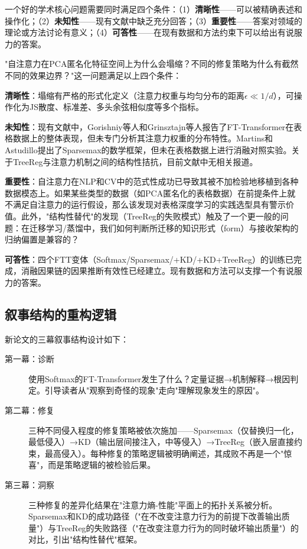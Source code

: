 \documentclass[UTF8,a4paper,12pt,fontset=fandol]{ctexart}
\begin{document}
一个好的学术核心问题需要同时满足四个条件：（1）\textbf{清晰性}——可以被精确表述和操作化；（2）\textbf{未知性}——现有文献中缺乏充分回答；（3）\textbf{重要性}——答案对领域的理论或方法讨论有意义；（4）\textbf{可答性}——在现有数据和方法约束下可以给出有说服力的答案。

"自注意力在PCA匿名化特征空间上为什么会塌缩？不同的修复策略为什么有截然不同的效果边界？"这一问题满足以上四个条件：

\textbf{清晰性}：塌缩有严格的形式化定义（注意力权重与均匀分布的距离$\epsilon \ll 1/d$），可操作化为JS散度、标准差、多头余弦相似度等多个指标。

\textbf{未知性}：现有文献中，Gorishniy等人\cite{gorishniy2021revisiting}和Grinsztajn等人\cite{grinsztajn2022tree}报告了FT-Transformer在表格数据上的整体表现，但未专门分析其注意力权重的分布特性。Martins和Astudillo\cite{martins2016sparsemax}提出了Sparsemax的数学框架，但未在表格数据上进行消融对照实验。关于TreeReg与注意力机制之间的结构性拮抗，目前文献中无相关报道。

\textbf{重要性}：自注意力在NLP和CV中的范式性成功已导致其被不加检验地移植到各种数据模态上。如果某些类型的数据（如PCA匿名化的表格数据）在前提条件上就不满足自注意力的运行假设，那么该发现对表格深度学习的实践选型具有警示价值。此外，"结构性替代"的发现（TreeReg的失败模式）触及了一个更一般的问题：在迁移学习/蒸馏中，我们如何判断所迁移的知识形式（form）与接收架构的归纳偏置是兼容的？

\textbf{可答性}：四个FTT变体（Softmax/Sparsemax/+KD/+KD+TreeReg）的训练已完成，消融因果链的因果推断有效性已经建立。现有数据和方法可以支撑一个有说服力的答案。

\subsection{叙事结构的重构逻辑}

新论文的三幕叙事结构设计如下：

\begin{description}
    \item[第一幕：诊断] 使用Softmax的FT-Transformer发生了什么？定量证据→机制解释→根因判定。引导读者从"观察到奇怪的现象"走向"理解现象发生的原因"。
    \item[第二幕：修复] 三种不同侵入程度的修复策略被依次施加——Sparsemax（仅替换归一化，最低侵入）→KD（输出层间接注入，中等侵入）→TreeReg（嵌入层直接约束，最高侵入）。每种修复的策略逻辑被明确阐述，其成败不再是一个"惊喜"，而是策略逻辑的被检验后果。
    \item[第三幕：洞察] 三种修复的差异化结果在"注意力熵-性能"平面上的拓扑关系被分析。Sparsemax和KD的成功路径（"在不改变注意力行为的前提下改善输出质量"）与TreeReg的失败路径（"在改变注意力行为的同时破坏输出质量"）的对比，引出"结构性替代"框架。
\end{description}
\end{document}
